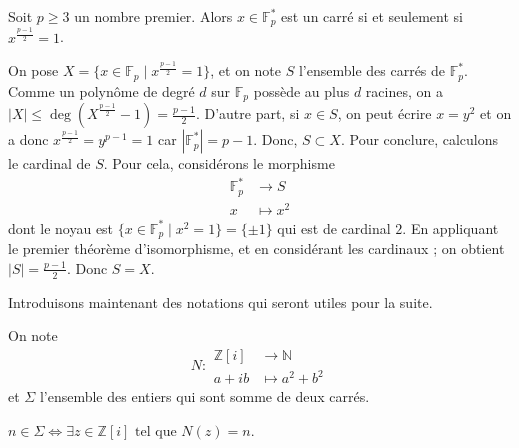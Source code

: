 




	
	\begin{lemma}
		\label{deux-carres-fermat-1}
		Soit $p \geq 3$ un nombre premier. Alors $x \in \mathbb{F}^*_p$ est un carré si et seulement si $x^{\frac{p-1}{2}} = 1$.
	\end{lemma}
	
	\begin{demonstration}
		On pose $X = \{ x \in \mathbb{F}_p \mid x^{\frac{p-1}{2}} = 1 \}$, et on note $S$ l'ensemble des carrés de $\mathbb{F}_p^*$. Comme un polynôme de degré $d$ sur $\mathbb{F}_p$ possède au plus $d$ racines, on a $|X| \leq \deg \left( X^{\frac{p-1}{2}} - 1 \right) = \frac{p-1}{2}$.
		\newpar
		D'autre part, si $x \in S$, on peut écrire $x = y^2$ et on a donc $x^{\frac{p-1}{2}} = y^{p-1} = 1$ car $|\mathbb{F}_p^*| = p-1$. Donc, $S \subset X$.
		\newpar
		Pour conclure, calculons le cardinal de $S$. Pour cela, considérons le morphisme
		\[
		\begin{array}{cl}
			\mathbb{F}_p^* &\rightarrow S \\
			x &\mapsto x^2
		\end{array}
		\]
		dont le noyau est $\{ x \in \mathbb{F}_p^* \mid x^2 = 1 \} = \{ \pm 1 \}$ qui est de cardinal $2$. En appliquant le premier théorème d'isomorphisme, et en considérant les cardinaux ; on obtient $|S| = \frac{p-1}{2}$. Donc $S = X$.
	\end{demonstration}

	Introduisons maintenant des notations qui seront utiles pour la suite.
	
	\begin{notation}
		On note \[ N :
		\begin{array}{cl}
			\mathbb{Z}[i] &\rightarrow \mathbb{N} \\
			a+ib &\mapsto a^2 + b^2
		\end{array}
		\] et $\Sigma$ l'ensemble des entiers qui sont somme de deux carrés.
	\end{notation}

	\begin{remark}
		\label{deux-carres-fermat-2}
		$n \in \Sigma \iff \exists z \in \mathbb{Z}[i] \text{ tel que } N(z)=n$.
	\end{remark}

